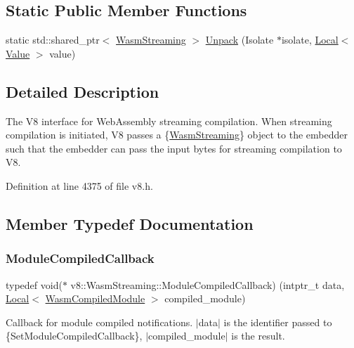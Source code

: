 \subsection*{Static Public Member Functions}
\begin{DoxyCompactItemize}
\item 
static std\+::shared\+\_\+ptr$<$ \mbox{\hyperlink{classv8_1_1WasmStreaming}{Wasm\+Streaming}} $>$ \mbox{\hyperlink{classv8_1_1WasmStreaming_a343acdb301ae8c21b49c177ac28f2b07}{Unpack}} (Isolate $\ast$isolate, \mbox{\hyperlink{classv8_1_1Local}{Local}}$<$ \mbox{\hyperlink{classv8_1_1Value}{Value}} $>$ value)
\end{DoxyCompactItemize}


\subsection{Detailed Description}
The V8 interface for Web\+Assembly streaming compilation. When streaming compilation is initiated, V8 passes a \{\mbox{\hyperlink{classv8_1_1WasmStreaming}{Wasm\+Streaming}}\} object to the embedder such that the embedder can pass the input bytes for streaming compilation to V8. 

Definition at line 4375 of file v8.\+h.



\subsection{Member Typedef Documentation}
\mbox{\label{classv8_1_1WasmStreaming_a2e8af849348cbd9fe9c3940ab010917d}} 
\subsubsection{\texorpdfstring{Module\+Compiled\+Callback}{ModuleCompiledCallback}}
{\footnotesize\ttfamily typedef void($\ast$ v8\+::\+Wasm\+Streaming\+::\+Module\+Compiled\+Callback) (intptr\+\_\+t data, \mbox{\hyperlink{classv8_1_1Local}{Local}}$<$ \mbox{\hyperlink{classv8_1_1WasmCompiledModule}{Wasm\+Compiled\+Module}} $>$ compiled\+\_\+module)}

Callback for module compiled notifications. $\vert$data$\vert$ is the identifier passed to \{Set\+Module\+Compiled\+Callback\}, $\vert$compiled\+\_\+module$\vert$ is the result. 


